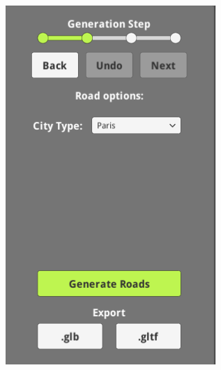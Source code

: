 \begin{figure}[H]
\begin{subfigure}[b]{0.24\textwidth}
  \end{subfigure}
  \begin{subfigure}[b]{0.24\textwidth}
    \includegraphics[width=\textwidth]{figure/results/gui2.png}
  \end{subfigure}
  \begin{subfigure}[b]{0.24\textwidth}

\end{subfigure}
\end{figure}
